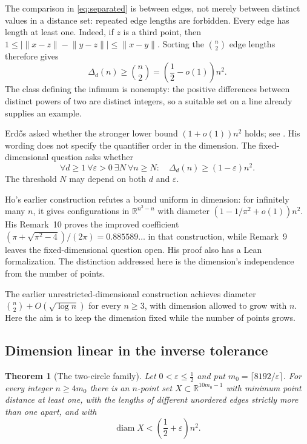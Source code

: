 \documentclass[11pt]{article}
\numberwithin{equation}{section}
\newtheorem{theorem}{Theorem}[section]
\theoremstyle{definition}\newtheorem{definition}[theorem]{Definition}
\theoremstyle{remark}\newtheorem{remark}[theorem]{Remark}
\newcommand{\R}{\mathbb R}\newcommand{\N}{\mathbb N}
\newcommand{\norm}[1]{\lVert #1\rVert}
\DeclareMathOperator{\diam}{diam}\DeclareMathOperator{\diag}{diag}
\begin{document}
The comparison in \eqref{eq:separated} is between edges, not merely between
distinct values in a distance set: repeated edge lengths are forbidden.
Every edge has length at least one. Indeed, if $z$ is a third point, then
$1\le|\norm{x-z}-\norm{y-z}|\le\norm{x-y}$. Sorting the $\binom n2$ edge
lengths therefore gives
\begin{equation}\label{eq:counting}
 \Delta_d(n)\ge\binom n2=\left(\frac12-o(1)\right)n^2.
\end{equation}
The class defining the infimum is nonempty: the positive differences between
distinct powers of two are distinct integers, so a suitable set on a line
already supplies an example.

Erd\H{o}s asked whether the stronger lower bound $(1+o(1))n^2$ holds;
see \cite[Problem~20]{Erdos}. His wording does not specify the quantifier
order in the dimension. The fixed-dimensional question asks whether
\begin{equation}\label{eq:conjecture}
 \forall d\ge1\ \forall\varepsilon>0\ \exists N\ \forall n\ge N:
 \quad \Delta_d(n)\ge(1-\varepsilon)n^2.
\end{equation}
The threshold $N$ may depend on both $d$ and $\varepsilon$.

Ho's earlier construction \cite{Ho} refutes a bound uniform in dimension:
for infinitely many $n$, it gives configurations in $\R^{n^2-n}$ with
diameter $(1-1/\pi^2+o(1))n^2$. His Remark~10 proves the improved coefficient
$(\pi+\sqrt{\pi^2-4})/(2\pi)=0.885589\ldots$ in that construction, while
Remark~9 leaves the fixed-dimensional question open. His proof also has a
Lean formalization. The distinction addressed here is the dimension's
independence from the number of points.

The earlier unrestricted-dimensional construction \cite{GrowingDimension}
achieves diameter $\binom n2+O(\sqrt{\log n})$ for every $n\ge3$, with
dimension allowed to grow with $n$. Here the aim is to keep the dimension
fixed while the number of points grows.

\subsection{Dimension linear in the inverse tolerance}

\begin{theorem}[The two-circle family]\label{thm:epsilon}
Let $0<\varepsilon\le\tfrac12$ and put
$m_0=\lceil8192/\varepsilon\rceil$. For every integer $n\ge4m_0$ there is an
$n$-point set $X\subset\R^{10m_0-1}$ with minimum point
distance at least one, with the lengths of different unordered edges
\emph{strictly} more than one apart, and with
\[
 \diam X<\left(\frac12+\varepsilon\right)n^2.
\]
\end{theorem}
\end{document}
